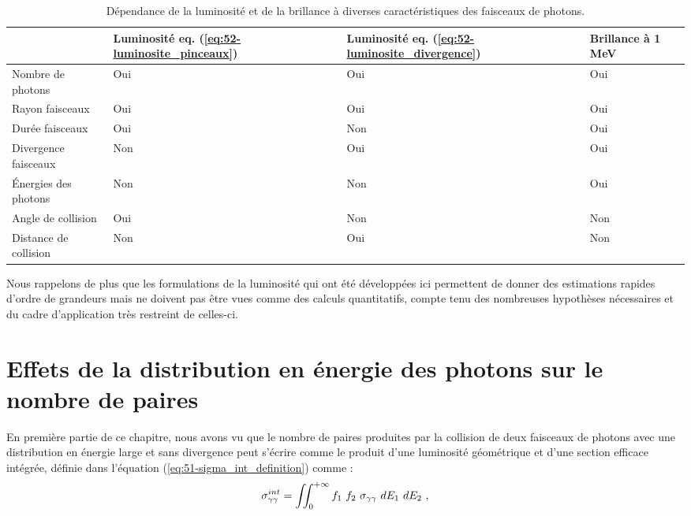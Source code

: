 \begin{refsection}
\begin{table}
    \centering
    \begin{tabular}{ | l | l | l || l |}
    \hline
    & Luminosité eq. (\ref{eq:52-luminosite_pinceaux})  & Luminosité eq. (\ref{eq:52-luminosite_divergence})     & Brillance à 1 MeV                \\
    \hline
    Nombre de photons           & Oui           & Oui           & Oui           \\
    Rayon faisceaux             & Oui           & Oui           & Oui           \\
    Durée faisceaux             & Oui           & Non           & Oui           \\
    Divergence faisceaux        & Non           & Oui           & Oui           \\
    Énergies des photons        & Non           & Non           & Oui           \\
    Angle de collision          & Oui           & Non           & Non           \\
    Distance de collision       & Non           & Oui           & Non           \\
    \hline
	\end{tabular}
    \caption{Dépendance de la luminosité et de la brillance à diverses caractéristiques des faisceaux de photons.}
	\label{tab:52-luminosite_brillance}
\end{table}

Nous rappelons de plus que les formulations de la luminosité qui ont été développées ici permettent de donner des estimations rapides d'ordre de grandeurs mais ne doivent pas être vues comme des calculs quantitatifs, compte tenu des nombreuses hypothèses nécessaires et du cadre d'application très restreint de celles-ci. 

\section{Effets de la distribution en énergie des photons sur le nombre de paires}

En première partie de ce chapitre, nous avons vu que le nombre de paires produites par la collision de deux faisceaux de photons avec une distribution en énergie large et sans divergence peut s’écrire comme le produit d'une luminosité géométrique et d'une section efficace intégrée, définie dans l'équation (\ref{eq:51-sigma_int_definition}) comme :
\begin{equation}
    \sigma_{\gamma\gamma}^{int} = \iint_{0}^{+\infty} f_1 ~ f_2 ~ \sigma_{\gamma\gamma} ~ dE_1 ~ dE_2 ~ \rm ,
\end{equation}


\end{refsection}
